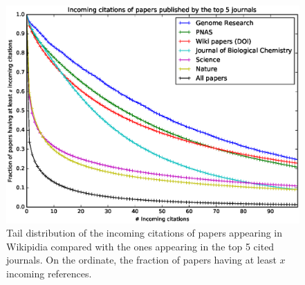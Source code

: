 \begin{figure}[h]
\centering
\includegraphics[keepaspectratio=true, width=\textwidth]{assets/incoming_citations_distribution_ccdf}
\caption{Tail distribution of the incoming citations of papers appearing in Wikipidia compared with the ones appearing in the top 5 cited journals.
On the ordinate, the fraction of papers having at least $x$ incoming references.}
\label{fig:incoming_citations_distribution_ccdf}
\end{figure}


